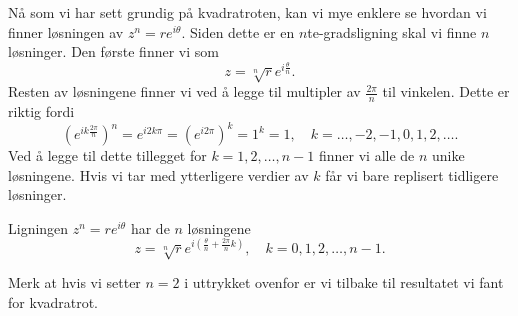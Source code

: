 \documentclass[a4paper,norsk,12pt]{article}
\begin{document}
Nå som vi har sett grundig på kvadratroten, kan vi mye enklere se hvordan vi finner løsningen av $z^n = re^{i\theta}$. Siden dette er en $n$te-gradsligning skal vi finne $n$ løsninger. Den første finner vi som
\begin{displaymath}
	z = \sqrt[n]{r}e^{i\frac{\theta}{n}}.
\end{displaymath}
Resten av løsningene finner vi ved å legge til multipler av $\frac{2\pi}{n}$ til vinkelen. Dette er riktig fordi
\begin{displaymath}
	\left(e^{ik\frac{2\pi}{n}}\right)^n = e^{i2k\pi} = (e^{i2\pi})^k = 1^k = 1, \quad k =  \ldots, -2, -1, 0, 1, 2, \ldots.
\end{displaymath}
Ved å legge til dette tillegget for $k=1, 2, \ldots, n-1$ finner vi alle de $n$ unike løsningene. Hvis vi tar med ytterligere verdier av $k$ får vi bare replisert tidligere løsninger.
\begin{tsummary}
	Ligningen $z^n = re^{i\theta}$ har de $n$ løsningene
	\begin{displaymath}
		z = \sqrt[n]{r}e^{i\left(\frac{\theta}{n} + \frac{2\pi}{n}k\right)}, \quad k=0,1,2,\ldots, n-1.
	\end{displaymath}
\end{tsummary}
\noindent
Merk at hvis vi setter $n=2$ i uttrykket ovenfor er vi tilbake til resultatet vi fant for kvadratrot.
\end{document}
